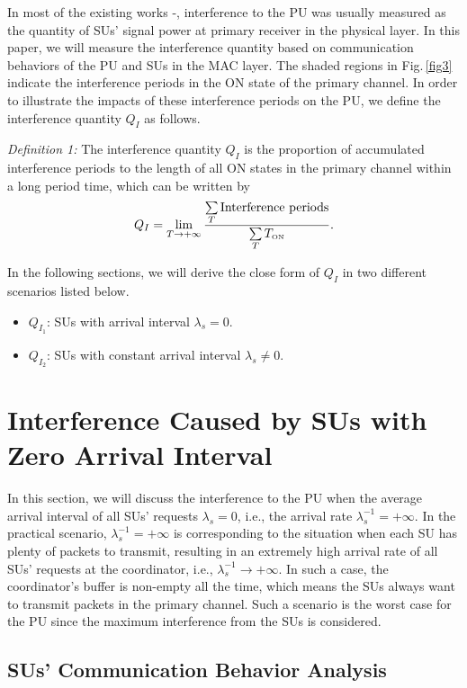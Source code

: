 \documentclass[11pt,draftcls]{IEEEtran}{\onecolumn}
\begin{document}
In most of the existing works \cite{0}-\cite{23}, interference to
the PU was usually measured as the quantity of SUs' signal power at
primary receiver in the physical layer. In this paper, we will
measure the interference quantity based on communication behaviors
of the PU and SUs in the MAC layer. The shaded regions in
Fig.\,\ref{fig3} indicate the interference periods in the ON state
of the primary channel. In order to illustrate the impacts of these
interference periods on the PU, we define the interference quantity
$Q_{I}$ as follows.

\emph{Definition 1:} The interference quantity $Q_{I}$ is the
proportion of accumulated interference periods to the length of all
ON states in the primary channel within a long period time, which
can be written by
\begin{equation}
Q_{I} = \lim\limits_{T\rightarrow +\infty}\frac{\sum\limits_{T}\mbox{Interference periods}}
{\sum\limits_{T} T_{\mbox{\tiny{ON}}}}.\label{qi}
\end{equation}

In the following sections, we will derive the close form of $Q_{I}$
in two different scenarios listed below.
\begin{itemize}
\item $Q_{I_1}$: SUs with arrival interval $\lambda_s=0$.
\item $Q_{I_2}$: SUs with constant arrival interval $\lambda_s \neq
0$.
\end{itemize}


\section{Interference Caused by SUs with Zero Arrival
Interval}\label{lambdas0}

In this section, we will discuss the interference to the PU when the
average arrival interval of all SUs' requests $\lambda_s=0$, i.e.,
the arrival rate $\lambda_s^{-1}=+\infty$. In the practical
scenario, $\lambda_s^{-1}=+\infty$ is corresponding to the situation
when each SU has plenty of packets to transmit, resulting in an
extremely high arrival rate of all SUs' requests at the coordinator,
i.e., $\lambda_s^{-1}\rightarrow+\infty$. In such a case, the
coordinator's buffer is non-empty all the time, which means the SUs
always want to transmit packets in the primary channel. Such a
scenario is the worst case for the PU since the maximum interference
from the SUs is considered.

\subsection{SUs' Communication Behavior Analysis}
\end{document}
